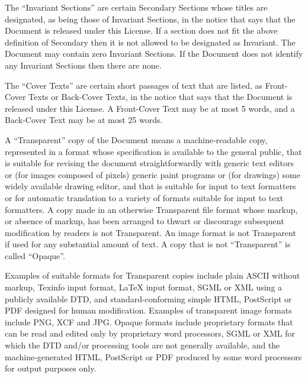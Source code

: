 {\tiny{}The \textquotedblleft Invariant Sections\textsf{''} are certain Secondary
Sections whose titles are designated, as being those of Invariant
Sections, in the notice that says that the Document is released under
this License. If a section does not fit the above definition of Secondary
then it is not allowed to be designated as Invariant. The Document
may contain zero Invariant Sections. If the Document does not identify
any Invariant Sections then there are none.}{\tiny\par}

{\tiny{}The \textquotedblleft Cover Texts\textsf{''} are certain short passages
of text that are listed, as Front-Cover Texts or Back-Cover Texts,
in the notice that says that the Document is released under this License.
A Front-Cover Text may be at most 5 words, and a Back-Cover Text may
be at most 25 words.}{\tiny\par}

{\tiny{}A \textquotedblleft Transparent\textsf{''} copy of the Document means
a machine-readable copy, represented in a format whose specification
is available to the general public, that is suitable for revising
the document straightforwardly with generic text editors or (for images
composed of pixels) generic paint programs or (for drawings) some
widely available drawing editor, and that is suitable for input to
text formatters or for automatic translation to a variety of formats
suitable for input to text formatters. A copy made in an otherwise
Transparent file format whose markup, or absence of markup, has been
arranged to thwart or discourage subsequent modification by readers
is not Transparent. An image format is not Transparent if used for
any substantial amount of text. A copy that is not \textquotedblleft Transparent\textsf{''}
is called \textquotedblleft Opaque\textsf{''}.}{\tiny\par}

{\tiny{}Examples of suitable formats for Transparent copies include
plain ASCII without markup, Texinfo input format, \LaTeX{} input format,
SGML or XML using a publicly available DTD, and standard-conforming
simple HTML, PostScript or PDF designed for human modification. Examples
of transparent image formats include PNG, XCF and JPG. Opaque formats
include proprietary formats that can be read and edited only by proprietary
word processors, SGML or XML for which the DTD and/or processing tools
are not generally available, and the machine-generated HTML, PostScript
or PDF produced by some word processors for output purposes only.}{\tiny\par}

